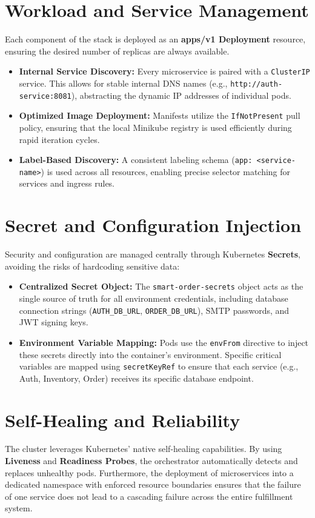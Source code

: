 \documentclass[12pt,a4paper]{report}
\begin{document}
\section{Workload and Service Management}
Each component of the stack is deployed as an \textbf{apps/v1 Deployment} resource, ensuring the desired number of replicas are always available.
\begin{itemize}
    \item \textbf{Internal Service Discovery:} Every microservice is paired with a \texttt{ClusterIP} service. This allows for stable internal DNS names (e.g., \texttt{http://auth-service:8081}), abstracting the dynamic IP addresses of individual pods.
    \item \textbf{Optimized Image Deployment:} Manifests utilize the \texttt{IfNotPresent} pull policy, ensuring that the local Minikube registry is used efficiently during rapid iteration cycles.
    \item \textbf{Label-Based Discovery:} A consistent labeling schema (\texttt{app: <service-name>}) is used across all resources, enabling precise selector matching for services and ingress rules.
\end{itemize}

\section{Secret and Configuration Injection}
Security and configuration are managed centrally through Kubernetes \textbf{Secrets}, avoiding the risks of hardcoding sensitive data:
\begin{itemize}
    \item \textbf{Centralized Secret Object:} The \texttt{smart-order-secrets} object acts as the single source of truth for all environment credentials, including database connection strings (\texttt{AUTH\_DB\_URL}, \texttt{ORDER\_DB\_URL}), SMTP passwords, and JWT signing keys.
    \item \textbf{Environment Variable Mapping:} Pods use the \texttt{envFrom} directive to inject these secrets directly into the container's environment. Specific critical variables are mapped using \texttt{secretKeyRef} to ensure that each service (e.g., Auth, Inventory, Order) receives its specific database endpoint.
\end{itemize}

\section{Self-Healing and Reliability}
The cluster leverages Kubernetes' native self-healing capabilities. By using \textbf{Liveness} and \textbf{Readiness Probes}, the orchestrator automatically detects and replaces unhealthy pods. Furthermore, the deployment of microservices into a dedicated namespace with enforced resource boundaries ensures that the failure of one service does not lead to a cascading failure across the entire fulfillment system.
\end{document}
